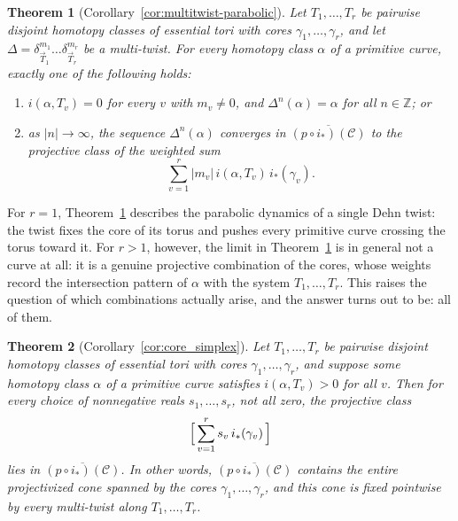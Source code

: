 \documentclass[12pt,a4paper]{amsart}
\numberwithin{equation}{section}
\newcommand{\ZZ}{\mathbb{Z}}
\theoremstyle{plain}
\newtheorem{theorem}{Theorem}[section]
\theoremstyle{definition}
\theoremstyle{remark}
\begin{document}
\begin{theorem}[Corollary~\ref{cor:multitwist-parabolic}] \label{thm:3}
    Let $T_1, \dots, T_r$ be pairwise disjoint homotopy classes of essential tori with cores $\gamma_1, \dots, \gamma_r$, and let $\Delta = \delta_{\vec{T}_1}^{m_1} \dots \delta_{\vec{T}_r}^{m_r}$ be a multi-twist.
    For every homotopy class $\alpha$ of a primitive curve, exactly one of the following holds:
    \begin{enumerate}
        \item $i(\alpha, T_v) = 0$ for every $v$ with $m_v \neq 0$, and $\Delta^n(\alpha) = \alpha$ for all $n \in \ZZ$; or
        \item as $\lvert n \rvert \to \infty$, the sequence $\Delta^n(\alpha)$ converges in $\overline{(p \circ i_*)(\mathcal{C})}$ to the projective class of the weighted sum
              \[
                  \sum_{v=1}^{r} \lvert m_v \rvert \, i(\alpha, T_v)\, i_*(\gamma_v).
              \]
    \end{enumerate}
\end{theorem}

For $r = 1$, Theorem~\ref{thm:3} describes the parabolic dynamics of a single Dehn twist: the twist fixes the core of its torus and pushes every primitive curve crossing the torus toward it.
For $r > 1$, however, the limit in Theorem~\ref{thm:3} is in general not a curve at all: it is a genuine projective combination of the cores, whose weights record the intersection pattern of $\alpha$ with the system $T_1, \dots, T_r$.
This raises the question of which combinations actually arise, and the answer turns out to be: all of them.

\begin{theorem}[Corollary~\ref{cor:core_simplex}] \label{thm:4}
    Let $T_1, \dots, T_r$ be pairwise disjoint homotopy classes of essential tori with cores $\gamma_1, \dots, \gamma_r$, and suppose some homotopy class $\alpha$ of a primitive curve satisfies $i(\alpha, T_v) > 0$ for all $v$.
    Then for every choice of nonnegative reals $s_1, \dots, s_r$, not all zero, the projective class
    \[
        \Bigl[\, \sum_{v=1}^{r} s_v \, i_*(\gamma_v) \,\Bigr]
    \]
    lies in $\overline{(p \circ i_*)(\mathcal{C})}$.
    In other words, $\overline{(p \circ i_*)(\mathcal{C})}$ contains the entire projectivized cone spanned by the cores $\gamma_1, \dots, \gamma_r$, and this cone is fixed pointwise by every multi-twist along $T_1, \dots, T_r$.
\end{theorem}
\end{document}
